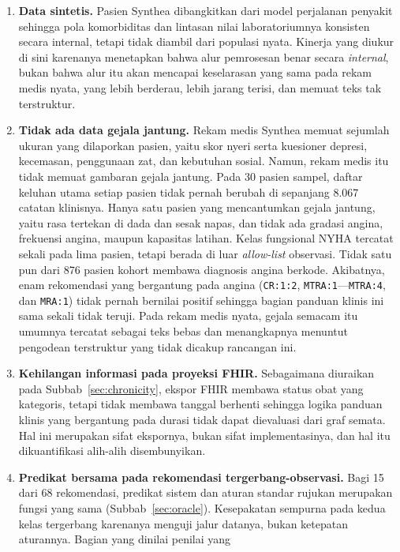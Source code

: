 \begin{enumerate}
    \item \textbf{Data sintetis.} Pasien Synthea dibangkitkan dari model perjalanan penyakit
    sehingga pola komorbiditas dan lintasan nilai laboratoriumnya konsisten secara internal,
    tetapi tidak diambil dari populasi nyata. Kinerja yang diukur di sini karenanya menetapkan
    bahwa alur pemrosesan benar secara \emph{internal}, bukan bahwa alur itu akan mencapai
    keselarasan yang sama pada rekam medis nyata, yang lebih berderau, lebih jarang terisi,
    dan memuat teks tak terstruktur.
    \item \textbf{Tidak ada data gejala jantung.} Rekam medis Synthea memuat sejumlah ukuran
    yang dilaporkan pasien, yaitu skor nyeri serta kuesioner depresi, kecemasan, penggunaan
    zat, dan kebutuhan sosial. Namun, rekam medis itu tidak memuat gambaran gejala jantung. Pada
    30 pasien sampel, daftar keluhan utama setiap pasien tidak pernah berubah di sepanjang
    8.067 catatan klinisnya. Hanya satu pasien yang mencantumkan gejala jantung, yaitu rasa
    tertekan di dada dan sesak napas, dan tidak ada gradasi angina, frekuensi angina, maupun
    kapasitas latihan. Kelas fungsional NYHA tercatat sekali pada lima pasien, tetapi berada di
    luar \emph{allow-list} observasi. Tidak satu pun dari 876 pasien kohort membawa diagnosis
    angina berkode. Akibatnya, enam rekomendasi yang bergantung pada angina (\texttt{CR:1:2},
    \texttt{MTRA:1}---\texttt{MTRA:4}, dan \texttt{MRA:1}) tidak pernah bernilai positif
    sehingga bagian panduan klinis ini sama sekali tidak teruji. Pada rekam medis nyata, gejala
    semacam itu umumnya tercatat sebagai teks bebas dan menangkapnya menuntut pengodean
    terstruktur yang tidak dicakup rancangan ini.
    \item \textbf{Kehilangan informasi pada proyeksi FHIR.} Sebagaimana diuraikan pada
    Subbab~\ref{sec:chronicity}, ekspor FHIR membawa status obat yang kategoris, tetapi tidak
    membawa tanggal berhenti sehingga logika panduan klinis yang bergantung pada durasi tidak dapat
    dievaluasi dari graf semata. Hal ini merupakan sifat ekspornya, bukan sifat implementasinya,
    dan hal itu dikuantifikasi alih-alih disembunyikan.
    \item \textbf{Predikat bersama pada rekomendasi tergerbang-observasi.} Bagi 15 dari 68
    rekomendasi, predikat sistem dan aturan standar rujukan merupakan fungsi yang sama
    (Subbab~\ref{sec:oracle}). Kesepakatan sempurna pada kedua kelas tergerbang karenanya
    menguji jalur datanya, bukan ketepatan aturannya. Bagian yang dinilai penilai yang

\end{enumerate}
